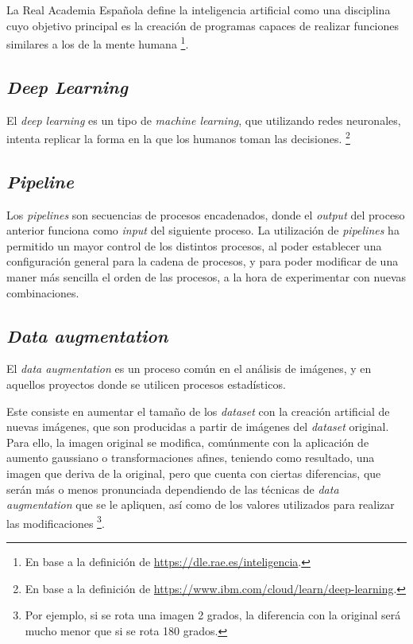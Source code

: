 La Real Academia Española define la inteligencia artificial como una disciplina cuyo objetivo principal es la creación de programas capaces de realizar funciones similares a los de la mente humana \footnote{En base a la definición de \url{https://dle.rae.es/inteligencia}.}.

\subsection{\textit{Deep Learning}}

El \textit{deep learning} es un tipo de \textit{machine learning}, que utilizando redes neuronales, intenta replicar la forma en la que los humanos toman las decisiones. \footnote{En base a la definición de \url{https://www.ibm.com/cloud/learn/deep-learning}.}

\subsection{\textit{Pipeline}}

Los \textit{pipelines} son secuencias de procesos encadenados, donde el \textit{output} del proceso anterior funciona como \textit{input} del siguiente proceso. La utilización de \textit{pipelines} ha permitido un mayor control de los distintos procesos, al poder 
establecer una configuración general para la cadena de procesos, y para poder modificar de una maner más sencilla el orden de las procesos, a la hora de experimentar con nuevas combinaciones.

\subsection{\textit{Data augmentation}}\label{dataaugmentation}

El \textit{data augmentation} es un proceso común en el análisis de imágenes, y en aquellos proyectos donde se utilicen procesos estadísticos. 

Este consiste en aumentar el tamaño de los \textit{dataset} con la creación artificial de nuevas imágenes, que son producidas a partir de imágenes del \textit{dataset} original.
Para ello, la imagen original se modifica, comúnmente con la aplicación de aumento gaussiano o transformaciones afines, teniendo como resultado, una imagen que deriva de la original, pero que cuenta con ciertas diferencias, que serán más o menos pronunciada dependiendo de las técnicas 
de \textit{data augmentation} que se le apliquen, así como de los valores utilizados para realizar las modificaciones \footnote{Por ejemplo, si se rota una imagen 2 grados, la diferencia con la original será mucho menor que si se rota 180 grados.}.	

